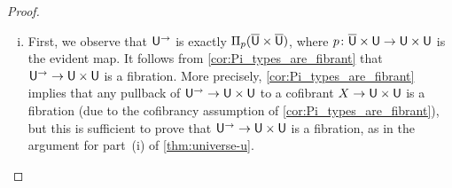\documentclass[reqno,10pt,a4paper,oneside,draft]{amsart}
\begin{document}
\begin{proof}
\leavevmode
\begin{enumerate}[(i)]
\item First, we observe that $\mathsf{U}^{\rightarrow}$ is exactly $\Pi_p(\overline{\mathsf{U}} \times \overline{\mathsf{U}})$, 
where $p \colon \overline{\mathsf{U}} \times \mathsf{U} \rightarrow \mathsf{U} \times \mathsf{U}$ is the evident map. 
It follows from \cref{cor:Pi_types_are_fibrant} that $\mathsf{U}^{\rightarrow} \rightarrow \mathsf{U} \times \mathsf{U}$ is a fibration.
More precisely, \cref{cor:Pi_types_are_fibrant} implies that any pullback of  $\mathsf{U}^{\rightarrow} \rightarrow \mathsf{U} \times \mathsf{U}$ to a cofibrant
$X \rightarrow \mathsf{U} \times \mathsf{U}$ is a fibration (due to the cofibrancy assumption of  \cref{cor:Pi_types_are_fibrant}),
but this is sufficient to prove that $\mathsf{U}^{\rightarrow} \rightarrow \mathsf{U} \times \mathsf{U}$ is a fibration,
as in the argument for part~(i) of  \cref{thm:universe-u}.


\end{enumerate}
\end{proof}
\end{document}
